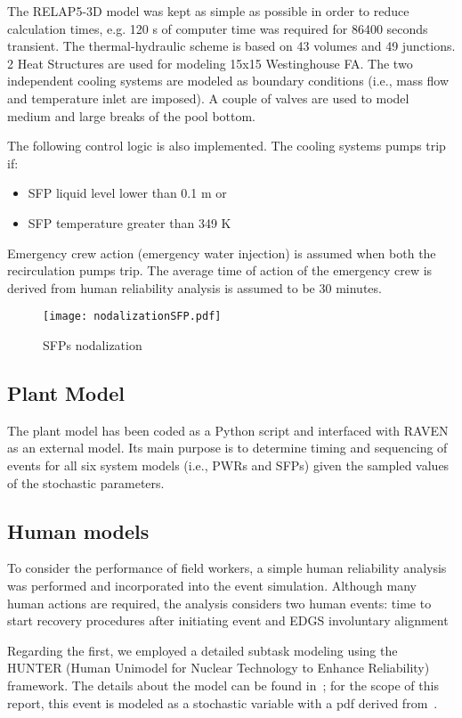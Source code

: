 The RELAP5-3D model was kept as simple as possible in order to reduce calculation times, e.g. 120 s 
of computer time was required for 86400 seconds transient. The thermal-hydraulic scheme is based on
43 volumes and 49 junctions. 2 Heat Structures are used for modeling 15x15 Westinghouse FA. 
The two independent cooling systems are modeled as boundary conditions (i.e., mass flow and 
temperature inlet are imposed). A couple of valves are used to model medium and large breaks of the pool bottom.

The following control logic is also implemented. The cooling systems pumps trip if: 
\begin{itemize}
  \item SFP liquid level lower than 0.1 m or
  \item SFP temperature greater than 349 K
\end{itemize}

Emergency crew action (emergency water injection) is assumed when both the recirculation pumps trip. 
The average time of action of the emergency crew is derived from human reliability analysis is assumed 
to be 30 minutes.

\begin{figure}
    \centering
    \texttt{[image: nodalizationSFP.pdf]}
    \caption{SFPs nodalization}
    \label{fig:SFPnodalization}
\end{figure}

\subsection{Plant Model}
\label{sec:plantModel}
The plant model has been coded as a Python script and interfaced with RAVEN as an 
external model. Its main purpose is to determine timing and sequencing of events 
for all six system models (i.e., PWRs and SFPs) given the sampled values of the 
stochastic parameters.

\subsection{Human models}
To consider the performance of field workers, a simple human reliability analysis was 
performed and incorporated into the event simulation. Although many human actions are 
required, the analysis considers two human events: time to start recovery procedures 
after initiating event and EDGS involuntary alignment

Regarding the first, we employed a detailed subtask modeling using the HUNTER (Human Unimodel 
for Nuclear Technology to Enhance Reliability)~\cite{boringHUNTER} framework. The details about 
the model can be found in~\cite{hunterReport2016}; for the scope of this report, this event 
is modeled as a stochastic variable with a pdf derived from~\cite{hunterReport2016}. 

